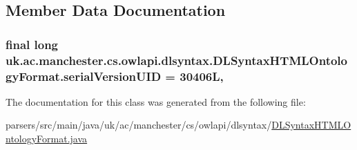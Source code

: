 \subsection{Member Data Documentation}
\hypertarget{classuk_1_1ac_1_1manchester_1_1cs_1_1owlapi_1_1dlsyntax_1_1_d_l_syntax_h_t_m_l_ontology_format_ac9848ad82dce7095eb8c12bf273ff4ba}{
\subsubsection[{serial\-Version\-U\-I\-D}]{\setlength{\rightskip}{0pt plus 5cm}final long uk.\-ac.\-manchester.\-cs.\-owlapi.\-dlsyntax.\-D\-L\-Syntax\-H\-T\-M\-L\-Ontology\-Format.\-serial\-Version\-U\-I\-D = 30406\-L\hspace{0.3cm}{\ttfamily [static]}, {\ttfamily [private]}}}\label{classuk_1_1ac_1_1manchester_1_1cs_1_1owlapi_1_1dlsyntax_1_1_d_l_syntax_h_t_m_l_ontology_format_ac9848ad82dce7095eb8c12bf273ff4ba}


The documentation for this class was generated from the following file\-:\begin{DoxyCompactItemize}
\item 
parsers/src/main/java/uk/ac/manchester/cs/owlapi/dlsyntax/\hyperlink{_d_l_syntax_h_t_m_l_ontology_format_8java}{D\-L\-Syntax\-H\-T\-M\-L\-Ontology\-Format.\-java}\end{DoxyCompactItemize}
